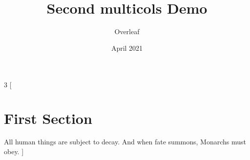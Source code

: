 \documentclass{article}
\title{Second multicols Demo}
\author{Overleaf}
\date{April 2021}
\begin{document}
	\maketitle
	\begin{multicols*}{3}
		[
		\section{First Section}
		All human things are subject to decay. And when fate summons, Monarchs must obey.
		]
		\blindtext\blindtext
	\end{multicols*}
	
\end{document}
